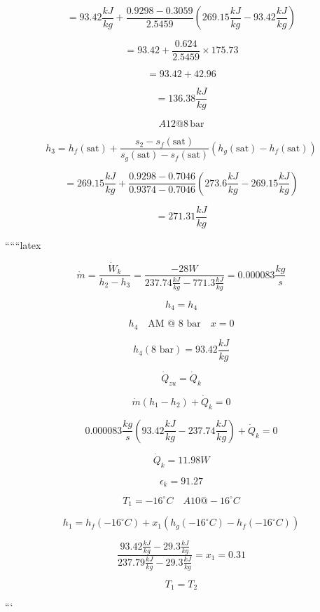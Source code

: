 \[
= 93.42 \frac{kJ}{kg} + \frac{0.9298 - 0.3059}{2.5459} (269.15 \frac{kJ}{kg} - 93.42 \frac{kJ}{kg})
\]

\[
= 93.42 + \frac{0.624}{2.5459} \times 175.73
\]

\[
= 93.42 + 42.96
\]

\[
= 136.38 \frac{kJ}{kg}
\]

\[
A12 @ 8 \, \text{bar}
\]

\[
h_3 = h_f(\text{sat}) + \frac{s_2 - s_f(\text{sat})}{s_g(\text{sat}) - s_f(\text{sat})} (h_g(\text{sat}) - h_f(\text{sat}))
\]

\[
= 269.15 \frac{kJ}{kg} + \frac{0.9298 - 0.7046}{0.9374 - 0.7046} (273.6 \frac{kJ}{kg} - 269.15 \frac{kJ}{kg})
\]

\[
= 271.31 \frac{kJ}{kg}
\]

``````latex

\[
\dot{m} = \frac{\dot{W}_k}{h_2 - h_3} = \frac{-28W}{237.74 \frac{kJ}{kg} - 771.3 \frac{kJ}{kg}} = 0.000083 \frac{kg}{s}
\]

\[
h_4 = h_4
\]

\[
h_4 \quad \text{AM @ 8 bar} \quad x = 0
\]

\[
h_4 (8 \text{ bar}) = 93.42 \frac{kJ}{kg}
\]

\[
\dot{Q}_{zu} = \dot{Q}_k
\]

\[
\dot{m} (h_1 - h_2) + \dot{Q}_k = 0
\]

\[
0.000083 \frac{kg}{s} \left( 93.42 \frac{kJ}{kg} - 237.74 \frac{kJ}{kg} \right) + \dot{Q}_k = 0
\]

\[
\dot{Q}_k = 11.98 W
\]

\[
\epsilon_k = 91.27
\]

\[
T_1 = -16^\circ C \quad A10 @ -16^\circ C
\]

\[
h_1 = h_f (-16^\circ C) + x_1 (h_g (-16^\circ C) - h_f (-16^\circ C))
\]

\[
\frac{93.42 \frac{kJ}{kg} - 29.3 \frac{kJ}{kg}}{237.79 \frac{kJ}{kg} - 29.3 \frac{kJ}{kg}} = x_1 = 0.31
\]

\[
T_1 = T_2
\]

```